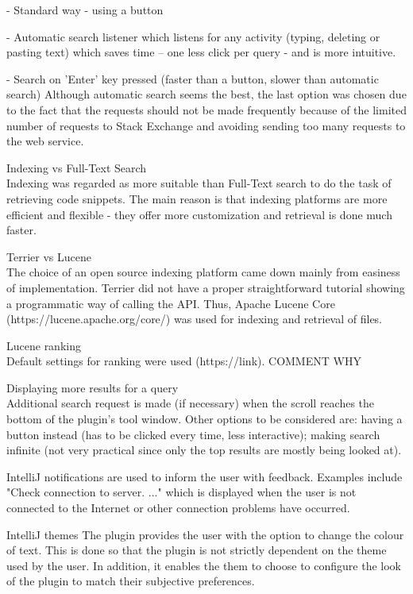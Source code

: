 \documentclass{l4proj}
\begin{document}
- Standard way - using a button

- Automatic search listener which listens for any activity (typing, deleting or pasting text) which saves time – one less click per query - and is more intuitive.

- Search on 'Enter' key pressed (faster than a button, slower than automatic search)
Although automatic search seems the best, the last option was chosen due to the fact that the requests should not be made frequently because of the limited number of requests to Stack Exchange and avoiding sending too many requests to the web service.

Indexing vs Full-Text Search\\
Indexing was regarded as more suitable than Full-Text search to do the task of retrieving code snippets. The main reason is that indexing platforms are more efficient and flexible - they offer more customization and retrieval is done much faster.

Terrier vs Lucene\\
The choice of an open source indexing platform came down mainly from easiness of implementation. Terrier did not have a proper straightforward tutorial showing a programmatic way of calling the API. Thus, Apache Lucene Core (https://lucene.apache.org/core/) was used for indexing and retrieval of files.

Lucene ranking\\
Default settings for ranking were used (https://link). COMMENT WHY

Displaying more results for a query\\
Additional search request is made (if necessary) when the scroll reaches the bottom of the plugin's tool window. Other options to be considered are: having a button instead (has to be clicked every time, less interactive); making search infinite (not very practical since only the top results are mostly being looked at).

IntelliJ notifications are used to inform the user with feedback. Examples include "Check connection to server. ..." which is displayed when the user is not connected to the Internet or other connection problems have occurred.

IntelliJ themes
The plugin provides the user with the option to change the colour of text. This is done so that the plugin is not strictly dependent on the theme used by the user. In addition, it enables the them to choose to configure the look of the plugin to match their subjective preferences.
\end{document}
